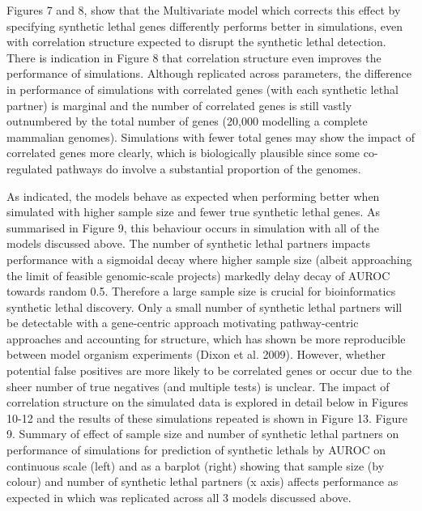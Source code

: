Figures 7 and 8, show that the Multivariate model which corrects this effect by specifying \gls{synthetic lethal} genes differently performs better in simulations, even with correlation structure expected to disrupt the \gls{synthetic lethal} detection.  There is indication in Figure 8 that correlation structure even improves the performance of simulations.  Although replicated across parameters, the difference in performance of simulations with correlated genes (with each \gls{synthetic lethal} partner) is marginal and the number of correlated genes is still vastly outnumbered by the total number of genes (20,000 modelling a complete mammalian \glspl{genome}).  Simulations with fewer total genes may show the impact of correlated genes more clearly, which is biologically plausible since some co-regulated pathways do involve a substantial proportion of the \glspl{genome}.

As indicated, the models behave as expected when performing better when simulated with higher sample size and fewer true \gls{synthetic lethal} genes.  As summarised in Figure 9, this behaviour occurs in simulation with all of the models discussed above.  The number of \gls{synthetic lethal} partners impacts performance with a sigmoidal decay where­­ higher sample size (albeit approaching the limit of feasible \gls{genomic}-scale projects) markedly delay decay of \gls{AUROC} towards random 0.5.  Therefore a large sample size is crucial for \gls{bioinformatics} \gls{synthetic lethal} discovery.  Only a small number of \gls{synthetic lethal} partners will be detectable with a gene-centric approach motivating pathway-centric approaches and accounting for  structure, which has shown be more reproducible between model organism experiments (Dixon et al. 2009).  However, whether potential false positives are more likely to be correlated genes or occur due to the sheer number of true negatives (and multiple tests) is unclear.  The impact of correlation structure on the simulated data is explored in detail below in Figures 10-12 and the results of these simulations repeated is shown in Figure 13.    Figure 9.  Summary of effect of sample size and number of \gls{synthetic lethal} partners on performance of simulations for prediction of \glspl{synthetic lethal} by \gls{AUROC} on continuous scale (left) and as a barplot (right) showing that sample size (by colour) and number of \gls{synthetic lethal} partners (x axis) affects performance as expected in which was replicated across all 3 models discussed above.

